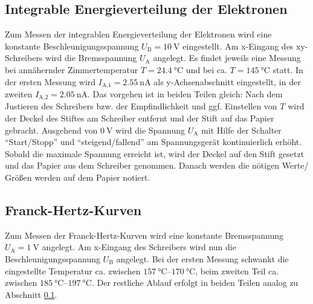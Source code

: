 \subsection{Integrable Energieverteilung der Elektronen}
\label{sec:enegieverteilung}
Zum Messen der integrablen Energieverteilung der Elektronen wird eine konstante Beschleunigungsspannung $U_\text{B} = \qty[]{10}{\volt}$ eingestellt.
Am x-Eingang des xy-Schreibers wird die Bremsspannung $U_\text{A}$ angelegt.
Es findet jeweils eine Messung bei annähernder Zimmertemperatur $T = \qty[]{24.4}{\celsius}$ und bei ca. $T = \qty[]{145}{\celsius}$ statt.
In der ersten Messung wird $I_\text{A,1} = \qty[]{2.55}{\nano\ampere}$ als y-Achsenabschnitt eingestellt, in der zweiten $I_\text{A,2} = \qty[]{2.05}{\nano\ampere}$.
Das vorgehen ist in beiden Teilen gleich: 
Nach dem Justieren des Schreibers bzw. der Empfindlichkeit und ggf. Einstellen von $T$ wird der Deckel des Stiftes am Schreiber entfernt 
und der Stift auf das Papier gebracht.
Ausgehend von $\qty[]{0}{\volt}$ wird die Spannung $U_\text{A}$ mit Hilfe der Schalter \enquote{Start/Stopp} und \enquote{steigend/fallend} 
am Spannungsgerät kontinuierlich erhöht.
Sobald die maximale Spannung erreicht ist, wird der Deckel auf den Stift gesetzt und das Papier aus dem Schreiber genommen.
Danach werden die nötigen Werte/ Größen werden auf dem Papier notiert.

\subsection{Franck-Hertz-Kurven}
Zum Messen der Franck-Hertz-Kurven wird eine konstante Bremsspannung $U_\text{A} = \qty[]{1}{\volt}$ angelegt.
Am x-Eingang des Schreibers wird nun die Beschleunigungsspannung $U_\text{B}$ angelegt.
Bei der ersten Messung schwankt die eingestellte Temperatur ca. zwischen $\qtyrange[]{157}{170}{\celsius}$,
beim zweiten Teil ca. zwischen $\qtyrange[]{185}{197}{\celsius}$.
Der restliche Ablauf erfolgt in beiden Teilen analog zu Abschnitt \ref{sec:enegieverteilung}.